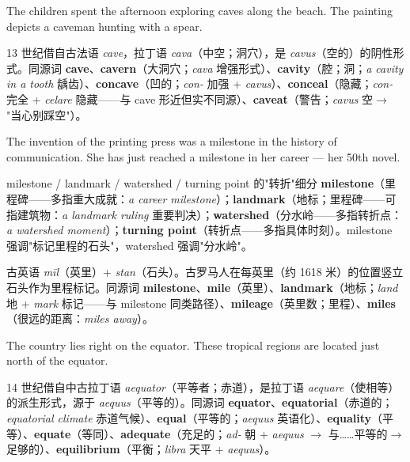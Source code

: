 \documentclass[../main.tex]{subfiles}
\begin{document}

{The children spent the afternoon exploring caves along the beach.}
{The painting depicts a caveman hunting with a spear.}

\begin{origin}
13 世纪借自古法语 \textit{cave}，拉丁语 \textit{cava}（中空；洞穴），是 \textit{cavus}（空的）的阴性形式。同源词 \textbf{cave}、\textbf{cavern}（大洞穴；\textit{cava} 增强形式）、\textbf{cavity}（腔；洞；\textit{a cavity in a tooth} 龋齿）、\textbf{concave}（凹的；\textit{con-} 加强 + \textit{cavus}）、\textbf{conceal}（隐藏；\textit{con-} 完全 + \textit{celare} 隐藏——与 cave 形近但实不同源）、\textbf{caveat}（警告；\textit{cavus} 空$\to$ "当心别踩空"）。
\end{origin}


{The invention of the printing press was a milestone in the history of communication.}
{She has just reached a milestone in her career — her 50th novel.}

\begin{lex}{milestone / landmark / watershed / turning point 的"转折"细分}
\textbf{milestone}（里程碑——多指重大成就：\textit{a career milestone}）；\textbf{landmark}（地标；里程碑——可指建筑物：\textit{a landmark ruling} 重要判决）；\textbf{watershed}（分水岭——多指转折点：\textit{a watershed moment}）；\textbf{turning point}（转折点——多指具体时刻）。milestone 强调"标记里程的石头"，watershed 强调"分水岭"。
\end{lex}

\begin{origin}
古英语 \textit{mīl}（英里）+ \textit{stan}（石头）。古罗马人在每英里（约 1618 米）的位置竖立石头作为里程标记。同源词 \textbf{milestone}、\textbf{mile}（英里）、\textbf{landmark}（地标；\textit{land} 地 + \textit{mark} 标记——与 milestone 同类路径）、\textbf{mileage}（英里数；里程）、\textbf{miles}（很远的距离：\textit{miles away}）。
\end{origin}


{The country lies right on the equator.}
{These tropical regions are located just north of the equator.}

\begin{origin}
14 世纪借自中古拉丁语 \textit{aequator}（平等者；赤道），是拉丁语 \textit{aequare}（使相等）的派生形式，源于 \textit{aequus}（平等的）。同源词 \textbf{equator}、\textbf{equatorial}（赤道的；\textit{equatorial climate} 赤道气候）、\textbf{equal}（平等的；\textit{aequus} 英语化）、\textbf{equality}（平等）、\textbf{equate}（等同）、\textbf{adequate}（充足的；\textit{ad-} 朝 + \textit{aequus} $\to$ 与……平等的$\to$足够的）、\textbf{equilibrium}（平衡；\textit{libra} 天平 + \textit{aequus}）。
\end{origin}
\end{document}
